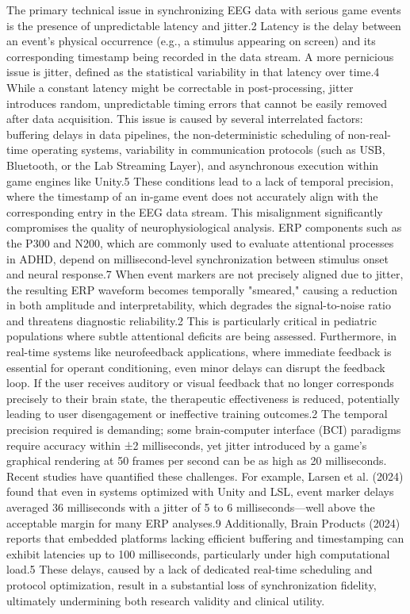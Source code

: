 The primary technical issue in synchronizing EEG data with serious game events is the presence of unpredictable latency and jitter.2
Latency is the delay between an event's physical occurrence (e.g., a stimulus appearing on screen) and its corresponding timestamp being recorded in the data stream. A more pernicious issue is jitter, defined as the statistical variability in that latency over time.4 While a constant latency might be correctable in post-processing, jitter introduces random, unpredictable timing errors that cannot be easily removed after data acquisition.
This issue is caused by several interrelated factors: buffering delays in data pipelines, the non-deterministic scheduling of non-real-time operating systems, variability in communication protocols (such as USB, Bluetooth, or the Lab Streaming Layer), and asynchronous execution within game engines like Unity.5 These conditions lead to a lack of temporal precision, where the timestamp of an in-game event does not accurately align with the corresponding entry in the EEG data stream.
This misalignment significantly compromises the quality of neurophysiological analysis. ERP components such as the P300 and N200, which are commonly used to evaluate attentional processes in ADHD, depend on millisecond-level synchronization between stimulus onset and neural response.7 When event markers are not precisely aligned due to jitter, the resulting ERP waveform becomes temporally "smeared," causing a reduction in both amplitude and interpretability, which degrades the signal-to-noise ratio and threatens diagnostic reliability.2 This is particularly critical in pediatric populations where subtle attentional deficits are being assessed.
Furthermore, in real-time systems like neurofeedback applications, where immediate feedback is essential for operant conditioning, even minor delays can disrupt the feedback loop. If the user receives auditory or visual feedback that no longer corresponds precisely to their brain state, the therapeutic effectiveness is reduced, potentially leading to user disengagement or ineffective training outcomes.2 The temporal precision required is demanding; some brain-computer interface (BCI) paradigms require accuracy within ±2 milliseconds, yet jitter introduced by a game's graphical rendering at 50 frames per second can be as high as 20 milliseconds.
Recent studies have quantified these challenges. For example, Larsen et al. (2024) found that even in systems optimized with Unity and LSL, event marker delays averaged 36 milliseconds with a jitter of 5 to 6 milliseconds—well above the acceptable margin for many ERP analyses.9 Additionally, Brain Products (2024) reports that embedded platforms lacking efficient buffering and timestamping can exhibit latencies up to 100 milliseconds, particularly under high computational load.5 These delays, caused by a lack of dedicated real-time scheduling and protocol optimization, result in a substantial loss of synchronization fidelity, ultimately undermining both research validity and clinical utility.


